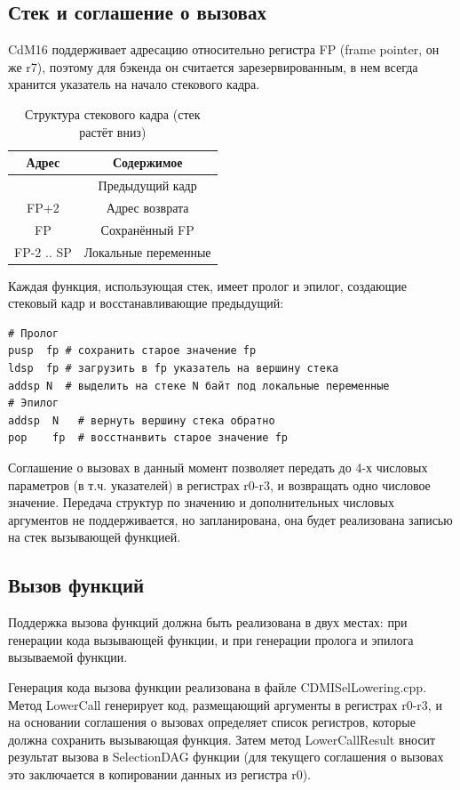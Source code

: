 \documentclass[a4paper,14pt]{extarticle}
\begin{document}
\subsection{Стек и соглашение о вызовах}
CdM16 поддерживает адресацию относительно регистра FP (frame pointer, он же r7), поэтому для бэкенда он считается зарезервированным, в нем всегда хранится указатель на начало стекового кадра.
\begin{table}[!h]
	\begin{center}
		\begin{tabular}{ |c|c| }
			\hline
			Адрес & Содержимое \\
			\hline
			 & Предыдущий кадр \\
			 FP+2 & Адрес возврата \\
			 FP & Сохранённый FP \\
			 FP-2 .. SP & Локальные переменные \\
			 \hline
		\end{tabular}
		\caption{Структура стекового кадра (стек растёт вниз)}
	\end{center}
\end{table}

Каждая функция, использующая стек, имеет пролог и эпилог, создающие стековый кадр и восстанавливающие предыдущий:
\begin{verbatim}
# Пролог
pusр  fp # сохранить старое значение fp
ldsp  fp # загрузить в fp указатель на вершину стека
addsp N  # выделить на стеке N байт под локальные переменные
# Эпилог
addsp  N   # вернуть вершину стека обратно
pop    fp  # восстнанвить старое значение fp
\end{verbatim}

Соглашение о вызовах в данный момент позволяет передать до 4-х числовых параметров (в т.ч. указателей) в регистрах r0-r3, и возвращать одно числовое значение. Передача структур по значению и дополнительных числовых аргументов не поддерживается, но запланирована, она будет реализована записью на стек вызывающей функцией.

\subsection{Вызов функций}

Поддержка вызова функций должна быть реализована в двух местах: при генерации кода вызывающей функции, и при генерации пролога и эпилога вызываемой функции.

Генерация кода вызова функции реализована в файле CDMISelLowering.cpp. Метод LowerCall генерирует код, размещающий аргументы в регистрах r0-r3, и на основании соглашения о вызовах определяет список регистров, которые должна сохранить вызывающая функция. Затем метод LowerCallResult вносит результат вызова в SelectionDAG функции (для текущего соглашения о вызовах это заключается в копировании данных из регистра r0).
\end{document}
